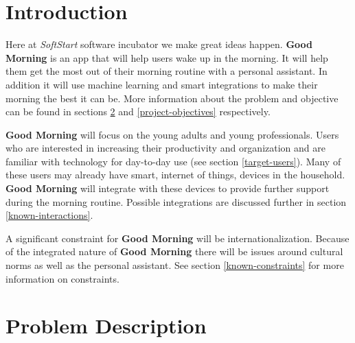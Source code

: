 \documentclass[11pt]{article}
\begin{document}
    
    
\setcounter{page}{1}
\glsresetall
\renewcommand{\arraystretch}{1.5} %
    
    
%
\section{Introduction}\label{introduction}

Here at \textit{SoftStart} software incubator we make great ideas happen.
\textbf{Good Morning} is an app that will help users wake up in the
morning. It will help them get the most out of their morning routine with a personal assistant. In addition it will use machine learning and smart integrations to make their morning the best it can be. More information about the problem and objective can be found in sections \ref{problem-description} and \ref{project-objectives} respectively.


\textbf{Good Morning} will focus on the young adults and young professionals. Users who are interested in increasing their productivity and organization and are familiar with technology for day-to-day use (see section \ref{target-users}). Many of these users may already have smart, internet of things, devices in the household. \textbf{Good Morning} will integrate with these devices to provide further support during the morning routine. Possible integrations are discussed further in section \ref{known-interactions}.

A significant constraint for \textbf{Good Morning} will be internationalization. Because of the integrated nature of \textbf{Good Morning} there will be issues around cultural norms as well as the personal assistant. See section \ref{known-constraints} for more information on constraints.

%
\section{Problem Description}\label{problem-description}
\end{document}
